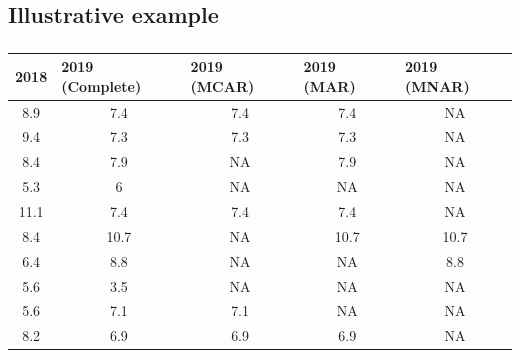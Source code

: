 \documentclass{beamer}
\begin{document}
\subsection{Illustrative example}
\begin{frame}
\frametitle{}
\begin{table}[]
	\begin{tabular}{ccccc}
		\multicolumn{1}{l}{2018} & \multicolumn{1}{l}{2019 (Complete)}& \multicolumn{1}{l}{2019 (MCAR)} & \multicolumn{1}{l}{2019 (MAR)} & \multicolumn{1}{l}{2019 (MNAR)} \\ \hline
		8.9                      & 7.4                                 & 7.4                             & 7.4                            & NA                              \\
		9.4                      & 7.3                                 & 7.3                             & 7.3                            & NA                              \\
		8.4                      & 7.9                                 & NA                              & 7.9                            & NA                              \\
		5.3                      & 6                                   & NA                              & NA                             & NA                              \\
		11.1                     & 7.4                                 & 7.4                             & 7.4                            & NA                              \\
		8.4                      & 10.7                                & NA                              & 10.7                           & 10.7                            \\
		6.4                      & 8.8                                 & NA                              & NA                             & 8.8                             \\
		5.6                      & 3.5                                 & NA                              & NA                             & NA                              \\
		5.6                      & 7.1                                 & 7.1                             & NA                             & NA                              \\
		8.2                      & 6.9                                 & 6.9                             & 6.9                            & NA                              
	\end{tabular}
 
\end{table}
\end{frame}
\end{document}
